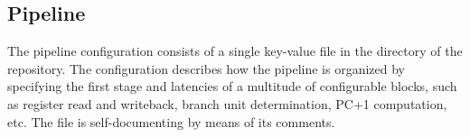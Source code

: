 
\subsection{Pipeline}
\label{sec:core-ug-cfg-pip}

The pipeline configuration consists of a single key-value file in the
 directory of the \rvex{} repository. The configuration
describes how the \rvex{} pipeline is organized by specifying the first stage
and latencies of a multitude of configurable blocks, such as register read and
writeback, branch unit determination, PC+1 computation, etc. The file is
self-documenting by means of its comments.

